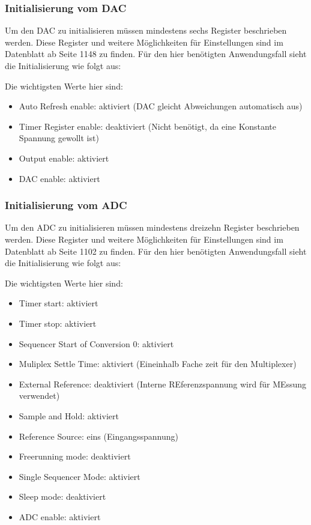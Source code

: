 \documentclass[paper=a4, 12pt]{scrreprt}
\begin{document}
		\subsubsection{Initialisierung vom DAC}\hfill \break
		Um den DAC zu initialisieren müssen mindestens sechs Register beschrieben werden. Diese Register und weitere Möglichkeiten für Einstellungen sind im Datenblatt ab Seite 1148 zu finden. Für den hier benötigten Anwendungsfall sieht die Initialisierung wie folgt aus: 		 
		
		Die wichtigsten Werte hier sind:
		\begin{itemize}
			\item Auto Refresh enable: aktiviert (DAC gleicht Abweichungen automatisch aus)
			\item Timer Register enable: deaktiviert (Nicht benötigt, da eine Konstante Spannung gewollt ist)
			\item Output enable: aktiviert
			\item DAC enable: aktiviert
		\end{itemize} \newpage
		\subsubsection{Initialisierung vom ADC}\hfill \break
		Um den ADC zu initialisieren müssen mindestens dreizehn Register beschrieben werden. Diese Register und weitere Möglichkeiten für Einstellungen sind im Datenblatt ab Seite 1102 zu finden. Für den hier benötigten Anwendungsfall sieht die Initialisierung wie folgt aus: 		 
		
		Die wichtigsten Werte hier sind:
		\begin{itemize}
			\item Timer start: aktiviert
			\item Timer stop: aktiviert 
			\item Sequencer Start of Conversion 0: aktiviert
			\item Muliplex Settle Time: aktiviert (Eineinhalb Fache zeit für den Multiplexer)
			\item External Reference: deaktiviert (Interne REferenzspannung wird für MEssung verwendet)
			\item Sample and Hold: aktiviert
			\item Reference Source: eins (Eingangsspannung)
			\item Freerunning mode: deaktiviert
			\item Single Sequencer Mode: aktiviert
			\item Sleep mode: deaktiviert
			\item ADC enable: aktiviert
		\end{itemize} \newpage
		
\end{document}
